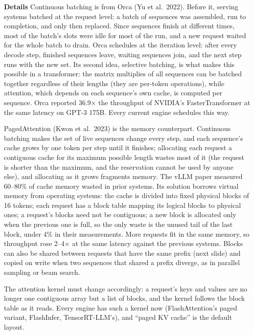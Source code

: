 \documentclass[11pt,letterpaper]{article}
\newcommand{\para}[1]{\medskip\noindent\textbf{#1}\quad}
\begin{document}
\para{Details} Continuous batching is from Orca (Yu et al.\ 2022). Before it, serving systems batched at the request level: a batch of sequences was assembled, run to completion, and only then replaced. Since sequences finish at different times, most of the batch's slots were idle for most of the run, and a new request waited for the whole batch to drain. Orca schedules at the iteration level: after every decode step, finished sequences leave, waiting sequences join, and the next step runs with the new set. Its second idea, selective batching, is what makes this possible in a transformer: the matrix multiplies of all sequences can be batched together regardless of their lengths (they are per-token operations), while attention, which depends on each sequence's own cache, is computed per sequence. Orca reported 36.9$\times$ the throughput of NVIDIA's FasterTransformer at the same latency on GPT-3 175B. Every current engine schedules this way.

PagedAttention (Kwon et al.\ 2023) is the memory counterpart. Continuous batching makes the set of live sequences change every step, and each sequence's cache grows by one token per step until it finishes; allocating each request a contiguous cache for its maximum possible length wastes most of it (the request is shorter than the maximum, and the reservation cannot be used by anyone else), and allocating as it grows fragments memory. The vLLM paper measured 60--80\% of cache memory wasted in prior systems. Its solution borrows virtual memory from operating systems: the cache is divided into fixed physical blocks of 16 tokens; each request has a block table mapping its logical blocks to physical ones; a request's blocks need not be contiguous; a new block is allocated only when the previous one is full, so the only waste is the unused tail of the last block, under 4\% in their measurements. More requests fit in the same memory, so throughput rose 2--4$\times$ at the same latency against the previous systems. Blocks can also be shared between requests that have the same prefix (next slide) and copied on write when two sequences that shared a prefix diverge, as in parallel sampling or beam search.

The attention kernel must change accordingly: a request's keys and values are no longer one contiguous array but a list of blocks, and the kernel follows the block table as it reads. Every engine has such a kernel now (FlashAttention's paged variant, FlashInfer, TensorRT-LLM's), and ``paged KV cache'' is the default layout.
\end{document}
